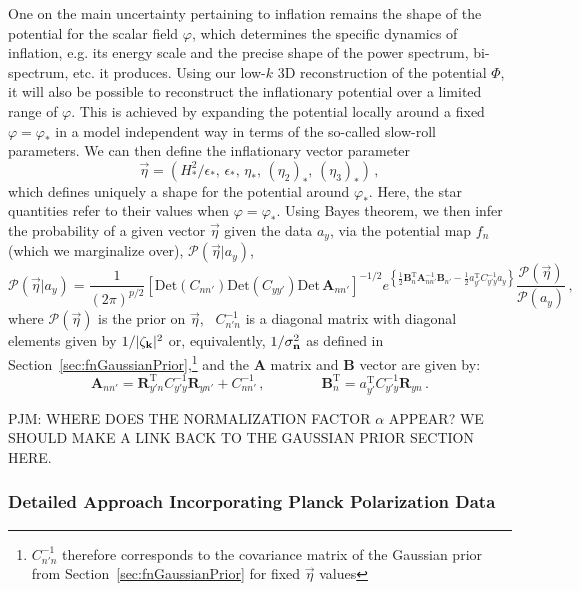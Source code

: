 \documentclass[psfig,11pt]{article}
\def\be{\begin{equation}}
\def\ee{\end{equation}}
\begin{document}
One on the main uncertainty pertaining to inflation remains the shape of the potential for the scalar field $\varphi$, which determines the specific dynamics of inflation, e.g. its energy scale and the precise shape of the power spectrum, bi-spectrum, etc. it produces. Using our low-$k$ 3D reconstruction of the potential $\Phi$, it will also be possible to reconstruct the inflationary potential over a limited range of $\varphi$. This is achieved by expanding the potential locally around a fixed $\varphi=\varphi_*$ in a model independent way in terms of the so-called slow-roll parameters. We can then define the inflationary vector parameter
\be
	\vec{\eta}=(H^2_*/\epsilon_*,\, \epsilon_*, \,\eta_*, \, (\eta_2)_*, \,(\eta_3)_*)\, ,
\ee
which defines uniquely a shape for the potential around $\varphi_*$. Here, the star quantities refer to their values when $\varphi=\varphi_*$. Using Bayes theorem, we then infer the probability of a given vector $\vec{\eta}$ given the data $a_y$, via the potential map $f_n$ (which we marginalize over), $\mathcal{P}(\vec{\eta}| a_{y})$,
\be
\mathcal{P}(\vec{\eta}| a_{y})=\frac{1}{(2\pi)^{p/2}} \left[\mathrm{Det}(C_{nn'})\mathrm{Det}(C_{yy'})\mathrm{Det}\,\mathbf{A}_{nn'}\right]^{-1/2}e^{\left\{\frac{1}{2}\mathbf{B}_{n}^{\mathrm{T}}\mathbf{A}_{nn'}^{-1}\mathbf{B}_{n'}-\frac{1}{2}a^{\mathrm{T}}_{y'}C_{y'y}^{-1}a_{y} \right\}}\frac{\mathcal{P}(\vec{\eta})}{\mathcal{P}(a_{y})}\, ,
\ee
where $\mathcal{P}(\vec{\eta})$ is the prior on $\vec{\eta}$, ~$C_{n'n}^{-1}$ is a diagonal matrix with diagonal elements given by $1/|\zeta_{{\bf k}}|^2$ or, equivalently, $1/{\sigma_{\bf n}^2}$ as defined in Section~\ref{sec:fnGaussianPrior},\footnote{$C_{n'n}^{-1}$ therefore corresponds to the covariance matrix of the Gaussian prior from Section~\ref{sec:fnGaussianPrior} for fixed $\vec{\eta}$ values} and the $\mathbf{A}$ matrix and $\mathbf{B}$ vector are given by:
\be
	\mathbf{A}_{nn'}=\mathbf{R}_{y'n}^{\mathrm{T}}C^{-1}_{y'y} \mathbf{R}_{yn'}+C_{nn'}^{-1}\, ,\qquad \qquad
	 \mathbf{B}_{n}^{\mathrm{T}}=a_{y'}^{\mathrm{T}}C_{y'y}^{-1}\mathbf{R}_{yn}\, .
\ee

PJM: WHERE DOES THE NORMALIZATION FACTOR $\alpha$ APPEAR? WE SHOULD MAKE A LINK BACK TO THE GAUSSIAN PRIOR SECTION HERE.


\subsubsection{Detailed Approach Incorporating Planck Polarization Data}
\end{document}
